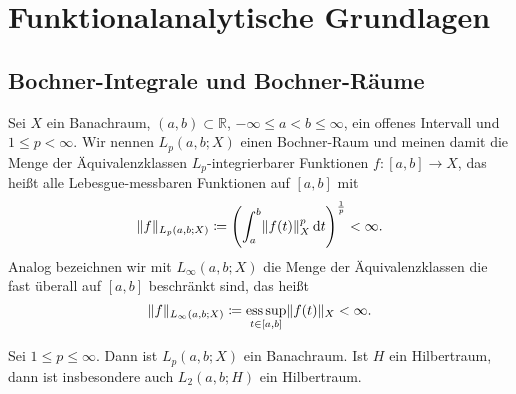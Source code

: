 
\chapter{Funktionalanalytische Grundlagen} %
\label{cha:funktionalanalytische_grundlagen}

\section{Bochner-Integrale und Bochner-Räume} %
\label{sec:bochner_r_ume}

\begin{Definition}
    Sei $X$ ein Banachraum, $(a, b) \subset \mathbb{R}$, $- \infty \leq a < b \leq \infty$, ein offenes Intervall und $1 \leq p < \infty$.
    Wir nennen $L_{p}(a, b; X)$ einen Bochner-Raum und meinen damit die Menge der Äquivalenzklassen $L_{p}$-integrierbarer Funktionen $f \colon [a, b] \to X$, das heißt alle Lebesgue-messbaren Funktionen auf $[a, b]$ mit
    \begin{equation}
        \lVert f\rVert_{L_{p}(a, b; X)} \coloneqq \left( \int_{a}^{b} \lVert f(t)\rVert_{X}^{p} \mathop{}\!\mathrm{d} t \right)^{\frac 1 p} < \infty.
    \end{equation}
    Analog bezeichnen wir mit $L_{\infty}(a, b; X)$ die Menge der Äquivalenzklassen die fast überall auf $[a, b]$ beschränkt sind, das heißt
    \begin{equation}
        \lVert f\rVert_{L_{\infty}(a, b; X)} \coloneqq \operatorname*{ess\,sup}_{t \in [a, b]} \lVert f(t)\rVert_{X} < \infty.
    \end{equation}
\end{Definition}

\begin{Lemma}
    Sei $1 \leq p \leq \infty$. Dann ist $L_{p}(a, b; X)$ ein Banachraum.
    Ist $H$ ein Hilbertraum, dann ist insbesondere auch $L_{2}(a, b; H)$ ein Hilbertraum.
\end{Lemma}


